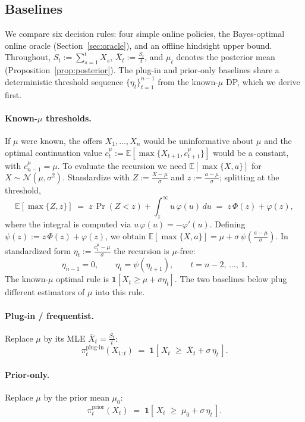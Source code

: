 \documentclass[11pt]{article}
\begin{document}
\subsection{Baselines}
\label{sec:baselines}

We compare six decision rules: four simple online policies, the Bayes-optimal online oracle (Section~\ref{sec:oracle}), and an offline hindsight upper bound. Throughout, $S_t := \sum_{s=1}^t X_s$, $\bar X_t := \frac{S_t}{t}$, and $\mu_t$ denotes the posterior mean (Proposition~\ref{prop:posterior}). The plug-in and prior-only baselines share a deterministic threshold sequence $\{\eta_t\}_{t=1}^{n-1}$ from the known-$\mu$ DP, which we derive first.

\paragraph{Known-$\mu$ thresholds.} If $\mu$ were known, the offers $X_1,\ldots,X_n$ would be uninformative about $\mu$ and the optimal continuation value $c_t^\mu := \mathbb{E}[\max\{X_{t+1}, c_{t+1}^\mu\}]$ would be a constant, with $c_{n-1}^\mu = \mu$. To evaluate the recursion we need $\mathbb{E}[\max\{X, a\}]$ for $X \sim \mathcal{N}(\mu, \sigma^2)$. Standardize with $Z := \frac{X-\mu}{\sigma}$ and $z := \frac{a-\mu}{\sigma}$; splitting at the threshold,
\[
\mathbb{E}[\max\{Z, z\}] \;=\; z\,\Pr(Z<z) + \int_z^\infty u\,\varphi(u)\,du \;=\; z\,\Phi(z) + \varphi(z),
\]
where the integral is computed via $u\,\varphi(u) = -\varphi'(u)$. Defining $\psi(z) := z\,\Phi(z) + \varphi(z)$, we obtain $\mathbb{E}[\max\{X,a\}] = \mu + \sigma\,\psi\!\left(\frac{a-\mu}{\sigma}\right)$. In standardized form $\eta_t := \frac{c_t^\mu - \mu}{\sigma}$ the recursion is $\mu$-free:
\begin{equation}
\label{eq:eta}
\eta_{n-1} = 0,
\qquad
\eta_t = \psi(\eta_{t+1}),
\qquad t = n-2,\,\ldots,\,1.
\end{equation}
The known-$\mu$ optimal rule is $\mathbf{1}[X_t \ge \mu + \sigma\eta_t]$. The two baselines below plug different estimators of $\mu$ into this rule.

\paragraph{Plug-in / frequentist.} Replace $\mu$ by its MLE $\bar X_t = \frac{S_t}{t}$:
\[
\pi_t^{\text{plug-in}}(X_{1:t}) \;=\; \mathbf{1}\!\left[\,X_t \;\ge\; \bar X_t + \sigma\,\eta_t\,\right].
\]

\paragraph{Prior-only.} Replace $\mu$ by the prior mean $\mu_0$:
\[
\pi_t^{\text{prior}}(X_t) \;=\; \mathbf{1}\!\left[\,X_t \;\ge\; \mu_0 + \sigma\,\eta_t\,\right].
\]
\end{document}
